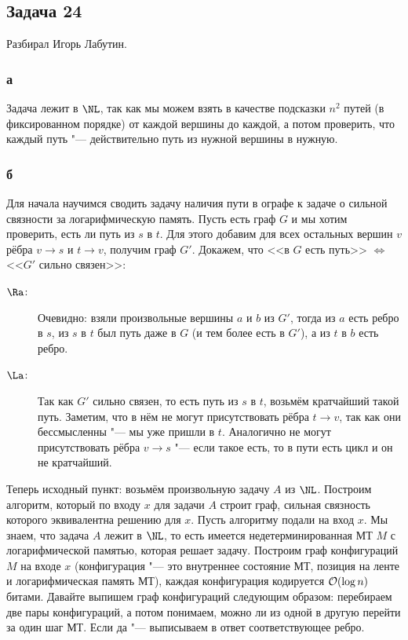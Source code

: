 \subsection{Задача 24}
	Разбирал Игорь Лабутин.

	\subsubsection{а}
		Задача лежит в $\NL$, так как мы можем взять в качестве подсказки
		$n^2$ путей (в фиксированном порядке) от каждой вершины до каждой,
		а потом проверить, что каждый путь "--- действительно путь из нужной вершины
		в нужную.

	\subsubsection{б}
		Для начала научимся сводить задачу наличия пути в ографе к
		задаче о сильной связности за логарифмическую память.
		Пусть есть граф $G$ и мы хотим проверить, есть ли путь из $s$ в $t$.
		Для этого добавим для всех остальных вершин $v$ рёбра $v \to s$ и $t \to v$,
		получим граф $G'$.
		Докажем, что <<в $G$ есть путь>> $\iff$ <<$G'$ сильно связен>>:
		\begin{description}
			\item[$\Ra$:]
				Очевидно: взяли произвольные вершины $a$ и $b$ из $G'$,
				тогда из $a$ есть ребро в $s$, из $s$ в $t$ был путь даже в
				$G$ (и тем более есть в $G'$), а из $t$ в $b$ есть ребро.
			\item[$\La$:]
				Так как $G'$ сильно связен, то есть путь из $s$ в $t$,
				возьмём кратчайший такой путь.
				Заметим, что в нём не могут присутствовать рёбра $t \to v$,
				так как они бессмысленны "--- мы уже пришли в $t$.
				Аналогично не могут присутствовать рёбра $v \to s$ "---
				если такое есть, то в пути есть цикл и он не кратчайший.
		\end{description}

		Теперь исходный пункт: возьмём произвольную задачу $A$ из $\NL$.
		Построим алгоритм, который по входу $x$ для задачи $A$ строит
		граф, сильная связность которого эквивалентна решению для $x$.
		Пусть алгоритму подали на вход $x$.
		Мы знаем, что задача $A$ лежит в $\NL$, то есть имеется недетерминированная
		МТ $M$ с логарифмической памятью, которая решает задачу.
		Построим граф конфигураций $M$ на входе $x$ (конфигурация "--- это внутреннее
		состояние МТ, позиция на ленте и логарифмическая память МТ), каждая
		конфигурация кодируется $\mathcal O(\log n)$ битами.
		Давайте выпишем граф конфигураций следующим образом: перебираем две пары конфигураций,
		а потом понимаем, можно ли из одной в другую перейти за один шаг МТ.
		Если да "--- выписываем в ответ соответствующее ребро.

